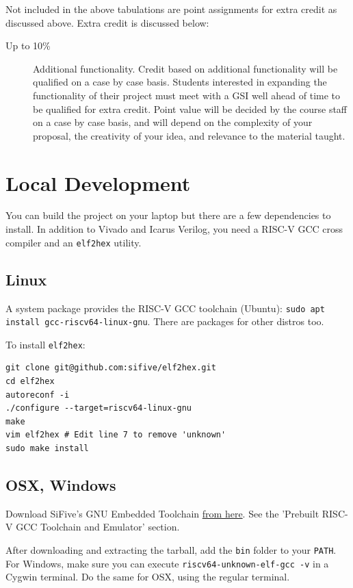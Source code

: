 \documentclass[11pt]{article}
\begin{document}
Not included in the above tabulations are point assignments for extra credit as discussed above. Extra credit is discussed below:

\begin{description}
  \item[Up to 10\%] Additional functionality. Credit based on additional functionality will be qualified on a case by case basis. Students interested in expanding the functionality of their project must meet with a GSI well ahead of time to be qualified for extra credit. Point value will be decided by the course staff on a case by case basis, and will depend on the complexity of your proposal, the creativity of your idea, and relevance to the material taught.
\end{description}

\newpage

\appendix
\section{Local Development}
You can build the project on your laptop but there are a few dependencies to install.
In addition to Vivado and Icarus Verilog, you need a RISC-V GCC cross compiler and an \verb|elf2hex| utility.

\subsection{Linux}
A system package provides the RISC-V GCC toolchain (Ubuntu): \verb|sudo apt install gcc-riscv64-linux-gnu|.
There are packages for other distros too.

To install \verb|elf2hex|:
\begin{verbatim}
git clone git@github.com:sifive/elf2hex.git
cd elf2hex
autoreconf -i
./configure --target=riscv64-linux-gnu
make
vim elf2hex # Edit line 7 to remove 'unknown'
sudo make install
\end{verbatim}

\subsection{OSX, Windows}
Download SiFive's GNU Embedded Toolchain \href{https://www.sifive.com/boards}{from here}.
See the 'Prebuilt RISC-V GCC Toolchain and Emulator' section.

After downloading and extracting the tarball, add the \verb|bin| folder to your \verb|PATH|.
For Windows, make sure you can execute \verb|riscv64-unknown-elf-gcc -v| in a Cygwin terminal.
Do the same for OSX, using the regular terminal.
\end{document}
